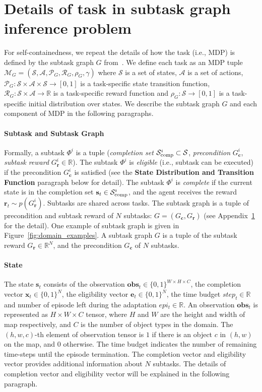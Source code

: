 \documentclass{article} \usepackage{iclr2020_conference,times}
\newcommand{\GC}{ G_{\mb{c}} }
\newcommand{\GR}{ G_{\mb{r}} }
\newcommand{\CSet}{ \mc{S}_{\text{comp}} }
\newcommand{\mb}{\mathbf}
\newcommand{\tb}{\textbf}
\newcommand{\mbb}{\mathbb}
\newcommand{\mc}{\mathcal}
\newcommand{\cutparagraphup}{\vspace{-2pt}}
\begin{document}
\section{Details of task in subtask graph inference problem}
\label{sec:appendix_task}
For self-containedness, we repeat the details of how the task (i.e., MDP) is defined by the subtask graph $G$ from~\citep{sohn2018hierarchical}.
We define each task as an MDP tuple $\mc{M}_{G}=(\mc{S, A}, \mc{P}_{G}, \mc{R}_{G}, \rho_{G},\gamma)$ where $\mc{S}$ is a set of states, $\mc{A}$ is a set of actions, $\mc{P}_{G}: \mc{S\times A\times S}\rightarrow [0,1]$ is a task-specific state transition function, $\mc{R}_{G}: \mc{S\times A}\rightarrow \mbb{R}$ is a task-specific reward function and $\rho_{G}: \mc{S}\rightarrow [0,1]$ is a task-specific initial distribution over states. 
We describe the subtask graph $G$ and each component of MDP in the following paragraphs.
\cutparagraphup
\paragraph{Subtask and Subtask Graph} Formally, a subtask $\Phi^i$ is a tuple (\textit{completion set} $\smash{\CSet^i}\subset\mc{S}$, \textit{precondition} $\GC^i$, \textit{subtask reward} $\GR^i\in\mbb{R}$).
The subtask $\Phi^i$ is \textit{eligible} (i.e., subtask can be executed) if the precondition $\GC^i$ is satisfied (see the \tb{State Distribution and Transition Function} paragraph below for detail).
The subtask $\Phi^i$ is \textit{complete} if the current state is in the completion set  $\mb{s}_t\in\smash{\CSet^i}$, and the agent receives the reward $\mb{r}_t \sim p(\GR^i)$.
Subtasks are shared across tasks. 
The subtask graph is a tuple of precondition and subtask reward of $N$ subtasks: $G=(\GC{}, \GR{})$ (see Appendix~\ref{sec:appendix_task} for the detail). One example of subtask graph is given in Figure~\ref{fig:domain_examples}.
A subtask graph $G$ is a tuple of the subtask reward $\GR{}\in\mbb{R}^{N}$, and the precondition $\GC{}$ of $N$ subtasks. 
\cutparagraphup
\paragraph{State} The state $\mb{s}_{t}$ consists of the observation $\mb{obs}_t\in\{0,1\}^{W\times H\times C}$, the completion vector $\mb{x}_t\in\{0,1\}^{N}$, the eligibility vector $\mb{e}_t\in\{0,1\}^{N}$, the time budget $step_t\in\mbb{R}$ and number of episode left during the adaptation $epi_t\in\mbb{R}$. An observation $\mb{obs}_t$ is represented as $H\times W\times C$ tensor, where $H$ and $W$ are the height and width of map respectively, and $C$ is the number of object types in the domain. The $(h,w,c)$-th element of observation tensor is $1$ if there is an object $c$ in $(h,w)$ on the map, and $0$ otherwise. The time budget indicates the number of remaining time-steps until the episode termination. The completion vector and eligibility vector provides additional information about $N$ subtasks. The details of completion vector and eligibility vector will be explained in the following paragraph.
\cutparagraphup
\end{document}
